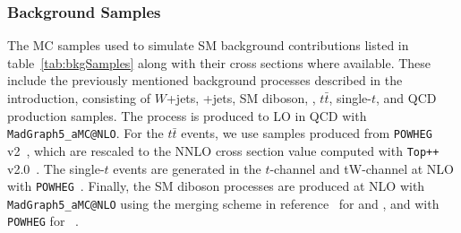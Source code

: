 %  

%  

%  

\subsubsection{Background Samples}

The MC samples used to simulate SM background contributions listed in table~\ref{tab:bkgSamples} along with their cross sections where available. %
These include the previously mentioned background processes described in the introduction, consisting of $W$+jets, \DY+jets, SM diboson, \bbbar, $t\bar{t}$, single-$t$, and QCD production samples.
The \Wjets process is produced to LO in QCD with \texttt{MadGraph5\_aMC@NLO}.
For the $t\bar{t}$ events, we use samples produced from \texttt{POWHEG} v2~\cite{Nason_2004,Frixione_2007,Alioli_2010,Alioli_2012}, which are rescaled to the NNLO cross section value computed with \texttt{Top++} v2.0~\cite{Czakon_2014}.
The single-$t$ events are generated in the $t$-channel and tW-channel at NLO with \texttt{POWHEG}~\cite{Alioli_2009,Re_2011}.
Finally, the SM diboson processes are produced at NLO with \texttt{MadGraph5\_aMC@NLO} using the merging scheme in reference~\cite{Frederix_2012} for \WZ and \ZZ, and with \texttt{POWHEG} for \WW~\cite{Nason_2014}.

